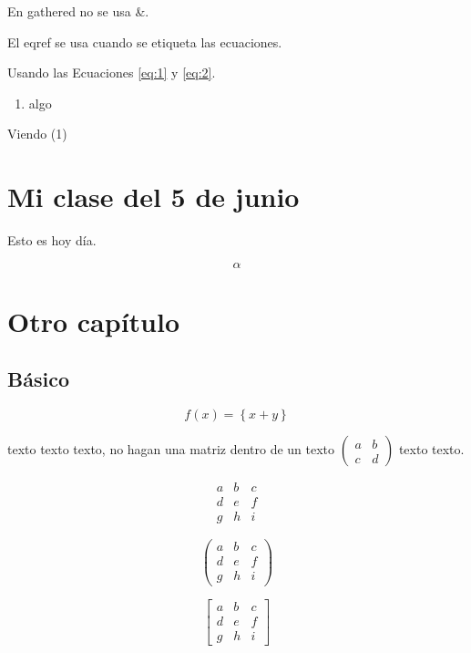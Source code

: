 \documentclass[12pt,a4paper]{report}
\numberwithin{equation}{section}
\begin{document}
En gathered no se usa \&.

El eqref se usa cuando se etiqueta las ecuaciones.

Usando las Ecuaciones \eqref{eq:1} y \eqref{eq:2}.

\begin{enumerate}
\item algo
\end{enumerate}

Viendo (1)%

\chapter{Mi clase del 5 de junio}

Esto es hoy día.

\begin{equation}
\alpha
\end{equation}

\chapter{Otro capítulo}

\section{Básico}

$$
f(x)=\left\{
x+y
\right\}
$$

texto texto texto, no hagan una matriz dentro de un texto $\left(\begin{smallmatrix} a & b\\ c & d \end{smallmatrix}\right)$ texto texto.

$$
\begin{matrix}
a & b & c \\
d & e & f \\
g & h & i
\end{matrix}
$$

$$
\begin{pmatrix}
a & b & c \\
d & e & f \\
g & h & i
\end{pmatrix}
$$

$$
\begin{bmatrix}
a & b & c \\
d & e & f \\
g & h & i
\end{bmatrix}
$$
\end{document}
